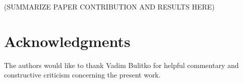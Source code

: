 \documentclass[letterpaper]{article}
\numberwithin{equation}{section}
\numberwithin{theorem}{section}
\numberwithin{lemma}{section}
\numberwithin{df}{section}
\begin{document}
(SUMMARIZE PAPER CONTRIBUTION AND RESULTS HERE)

\section*{Acknowledgments}

The authors would like to thank Vadim Bulitko for helpful commentary and constructive criticism concerning the present work.



\end{document}
